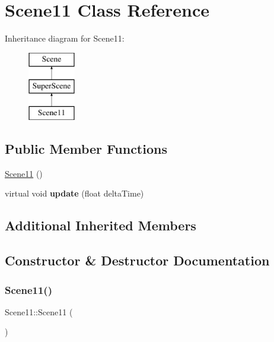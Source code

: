 \hypertarget{class_scene11}{}\section{Scene11 Class Reference}
\label{class_scene11}
Inheritance diagram for Scene11\+:\begin{figure}[H]
\begin{center}
\leavevmode
\includegraphics[height=3.000000cm]{class_scene11}
\end{center}
\end{figure}
\subsection*{Public Member Functions}
\begin{DoxyCompactItemize}
\item 
\hyperlink{class_scene11_a6a08d93da87ca19d59ddf98472c0b626}{Scene11} ()
\item 
\mbox{\label{class_scene11_a17ec6c8da0b2402c79537d7eef7c63aa}} 
virtual void {\bfseries update} (float delta\+Time)
\end{DoxyCompactItemize}
\subsection*{Additional Inherited Members}


\subsection{Constructor \& Destructor Documentation}
\mbox{\label{class_scene11_a6a08d93da87ca19d59ddf98472c0b626}} 
\subsubsection{\texorpdfstring{Scene11()}{Scene11()}}
{\footnotesize\ttfamily Scene11\+::\+Scene11 (\begin{DoxyParamCaption}{ }\end{DoxyParamCaption})}

